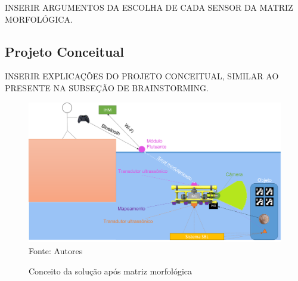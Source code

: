 INSERIR ARGUMENTOS DA ESCOLHA DE CADA SENSOR DA MATRIZ MORFOLÓGICA.

\subsection{Projeto Conceitual}
\label{subsec:projeto-conceitual}


INSERIR EXPLICAÇÕES DO PROJETO CONCEITUAL, SIMILAR AO PRESENTE NA SUBSEÇÃO DE BRAINSTORMING.

\begin{figure}[h]
	\centering
	\caption{Conceito da solução após matriz morfológica}
	\label{fig:conceito-final}
	\includegraphics[width=1\linewidth]{images/conceito-final}\\
	\footnotesize Fonte: Autores
\end{figure}



